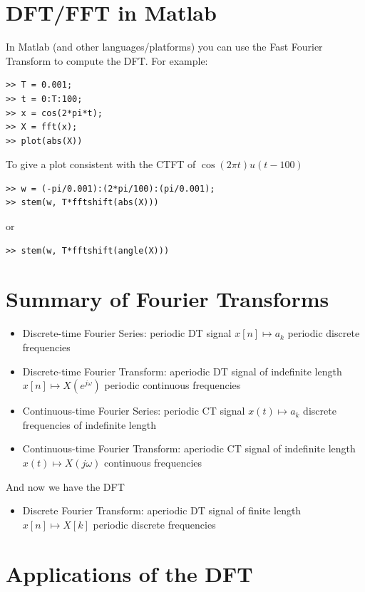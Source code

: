 \section{DFT/FFT in Matlab}

In Matlab (and other languages/platforms) you can use the Fast Fourier Transform to compute the DFT. For example:

\begin{verbatim}
>> T = 0.001;
>> t = 0:T:100;
>> x = cos(2*pi*t);
>> X = fft(x);
>> plot(abs(X))
\end{verbatim}
To give a plot consistent with the CTFT of $\cos(2\pi t)u(t-100)$
\begin{verbatim}
>> w = (-pi/0.001):(2*pi/100):(pi/0.001);
>> stem(w, T*fftshift(abs(X)))
\end{verbatim}
or
\begin{verbatim}
>> stem(w, T*fftshift(angle(X)))
\end{verbatim}


\section{Summary of Fourier Transforms}

\begin{itemize}
\item Discrete-time Fourier Series: periodic DT signal $x[n] \mapsto a_k$ periodic discrete frequencies
\item Discrete-time Fourier Transform: aperiodic DT signal of indefinite length $x[n] \mapsto X(e^{j\omega})$ periodic continuous frequencies
\item Continuous-time Fourier Series: periodic CT signal  $x(t) \mapsto a_k$ discrete frequencies of indefinite length
\item Continuous-time Fourier Transform: aperiodic CT signal of indefinite length  $x(t) \mapsto X(j\omega)$ continuous frequencies 
\end{itemize}

And now we have the DFT
\begin{itemize}
\item Discrete Fourier Transform: aperiodic DT signal of finite length $x[n] \mapsto X[k]$ periodic discrete frequencies
\end{itemize}

\section{Applications of the DFT}

